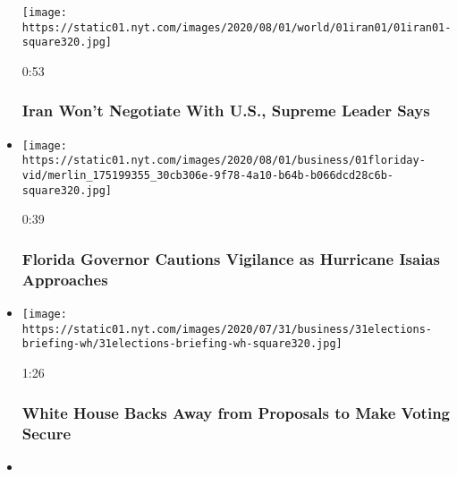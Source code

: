 \begin{itemize}
  \texttt{[image: https://static01.nyt.com/images/2020/08/01/world/01iran01/01iran01-square320.jpg]}

  0:53

  \hypertarget{iran-wont-negotiate-with-us-supreme-leader-says}{%
  \subsubsection{Iran Won't Negotiate With U.S., Supreme Leader
  Says}\label{iran-wont-negotiate-with-us-supreme-leader-says}}
\item
  \href{https://www.nytimes.com/video/us/100000007268424/desantis-florida-hurricane-isaias.html?action=click\&module=video-series-bar\&region=header\&pgtype=Article\&playlistId=video/latest-video}{}

  \texttt{[image: https://static01.nyt.com/images/2020/08/01/business/01floriday-vid/merlin\_175199355\_30cb306e-9f78-4a10-b64b-b066dcd28c6b-square320.jpg]}

  0:39

  \hypertarget{florida-governor-cautions-vigilance-as-hurricane-isaias-approaches}{%
  \subsubsection{Florida Governor Cautions Vigilance as Hurricane Isaias
  Approaches}\label{florida-governor-cautions-vigilance-as-hurricane-isaias-approaches}}
\item
  \href{https://www.nytimes.com/video/us/100000007267362/white-house-mail-in-ballots-election.html?action=click\&module=video-series-bar\&region=header\&pgtype=Article\&playlistId=video/latest-video}{}

  \texttt{[image: https://static01.nyt.com/images/2020/07/31/business/31elections-briefing-wh/31elections-briefing-wh-square320.jpg]}

  1:26

  \hypertarget{white-house-backs-away-from-proposals-to-make-voting-secure}{%
  \subsubsection{White House Backs Away from Proposals to Make Voting
  Secure}\label{white-house-backs-away-from-proposals-to-make-voting-secure}}
\item
  \href{https://www.nytimes.com/video/us/politics/100000007266983/johnson-coronavirus-restrictions.html?action=click\&module=video-series-bar\&region=header\&pgtype=Article\&playlistId=video/latest-video}{}


\end{itemize}
